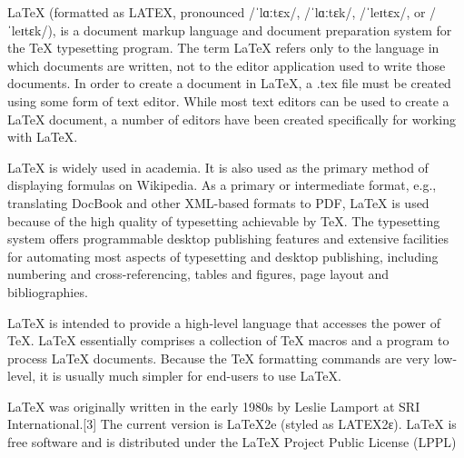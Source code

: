
LaTeX (formatted as LATEX, pronounced /ˈlɑːtɛx/, /ˈlɑːtɛk/, /ˈleɪtɛx/, or /ˈleɪtɛk/), is a document markup language and document preparation system for the TeX typesetting program. The term LaTeX refers only to the language in which documents are written, not to the editor application used to write those documents. In order to create a document in LaTeX, a .tex file must be created using some form of text editor. While most text editors can be used to create a LaTeX document, a number of editors have been created specifically for working with LaTeX.

LaTeX is widely used in academia.\cite{WrTex,Alexia} It is also used as the primary method of displaying formulas on Wikipedia. As a primary or intermediate format, e.g., translating DocBook and other XML-based formats to PDF, LaTeX is used because of the high quality of typesetting achievable by TeX. The typesetting system offers programmable desktop publishing features and extensive facilities for automating most aspects of typesetting and desktop publishing, including numbering and cross-referencing, tables and figures, page layout and bibliographies.

LaTeX is intended to provide a high-level language that accesses the power of TeX. LaTeX essentially comprises a collection of TeX macros and a program to process LaTeX documents. Because the TeX formatting commands are very low-level, it is usually much simpler for end-users to use LaTeX.

LaTeX was originally written in the early 1980s by Leslie Lamport at SRI International.[3] The current version is LaTeX2e (styled as LATEX2ε). LaTeX is free software and is distributed under the LaTeX Project Public License (LPPL)

\newcommand{\keywords}{\LaTeX}
